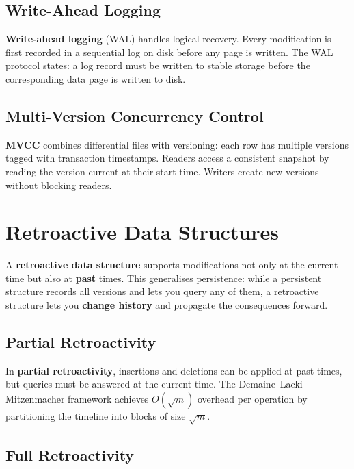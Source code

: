 \subsection{Write-Ahead Logging}

\textbf{Write-ahead logging} (WAL) handles logical recovery. Every modification is first recorded in a sequential log on disk before any page is written. The WAL protocol states: a log record must be written to stable storage before the corresponding data page is written to disk.

\subsection{Multi-Version Concurrency Control}

\textbf{MVCC} combines differential files with versioning: each row has multiple versions tagged with transaction timestamps. Readers access a consistent snapshot by reading the version current at their start time. Writers create new versions without blocking readers.

\section{Retroactive Data Structures}
\label{sec21:retroactive-structures}

A \textbf{retroactive data structure} supports modifications not only at the current time but also at \textbf{past} times. This generalises persistence: while a persistent structure records all versions and lets you query any of them, a retroactive structure lets you \textbf{change history} and propagate the consequences forward.

\subsection{Partial Retroactivity}

In \textbf{partial retroactivity}, insertions and deletions can be applied at past times, but queries must be answered at the current time. The Demaine--Lacki--Mitzenmacher framework achieves $O(\sqrt{m})$ overhead per operation by partitioning the timeline into blocks of size $\sqrt{m}$.

\subsection{Full Retroactivity}


